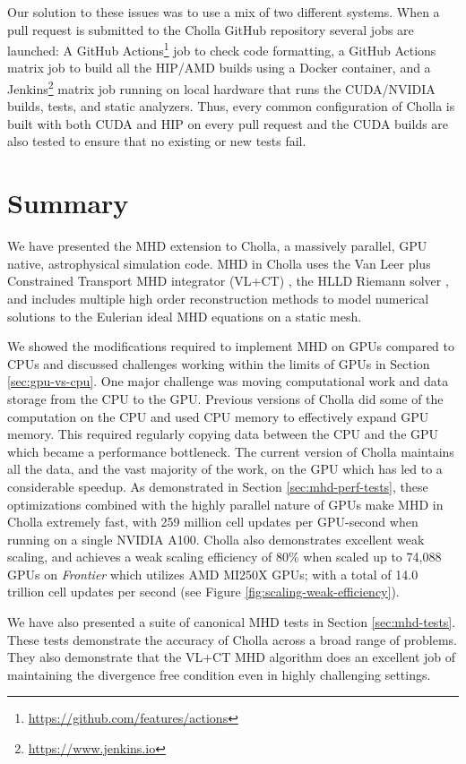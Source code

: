 \documentclass[modern]{aastex631}
\begin{document}
Our solution to these issues was to use a mix of two different systems. When a pull request is submitted to the Cholla GitHub repository several jobs are launched: A GitHub Actions\footnote{\url{https://github.com/features/actions}} job to check code formatting, a GitHub Actions matrix job to build all the HIP/AMD builds using a Docker container, and a Jenkins\footnote{\url{https://www.jenkins.io}} matrix job running on local hardware that runs the CUDA/NVIDIA builds, tests, and static analyzers. Thus, every common configuration of Cholla is built with both CUDA and HIP on every pull request and the CUDA builds are also tested to ensure that no existing or new tests fail.


\section{Summary}
\label{sec:summary}

We have presented the MHD extension to Cholla, a massively parallel, GPU native, astrophysical simulation code. MHD in Cholla uses the Van Leer plus Constrained Transport MHD integrator (VL+CT) \citep{stone_2009}, the HLLD Riemann solver \citep{hlld_2005}, and includes multiple high order reconstruction methods to model numerical solutions to the Eulerian ideal MHD equations on a static mesh.

We showed the modifications required to implement MHD on GPUs compared to CPUs and discussed challenges working within the limits of GPUs in Section \ref{sec:gpu-vs-cpu}. One major challenge was moving computational work and data storage from the CPU to the GPU. Previous versions of Cholla did some of the computation on the CPU and used CPU memory to effectively expand GPU memory. This required regularly copying data between the CPU and the GPU which became a performance bottleneck. The current version of Cholla maintains all the data, and the vast majority of the work, on the GPU which has led to a considerable speedup. As demonstrated in Section \ref{sec:mhd-perf-tests}, these optimizations combined with the highly parallel nature of GPUs make MHD in Cholla extremely fast, with 259 million cell updates per GPU-second when running on a single NVIDIA A100. Cholla also demonstrates excellent weak scaling, and achieves a weak scaling efficiency of 80\% when scaled up to 74,088 GPUs on \textit{Frontier} which utilizes AMD MI250X GPUs; with a total of 14.0 trillion cell updates per second (see Figure \ref{fig:scaling-weak-efficiency}).

We have also presented a suite of canonical MHD tests in Section \ref{sec:mhd-tests}. These tests demonstrate the accuracy of Cholla across a broad range of problems. They also demonstrate that the VL+CT MHD algorithm does an excellent job of maintaining the divergence free condition even in highly challenging settings.
\end{document}
